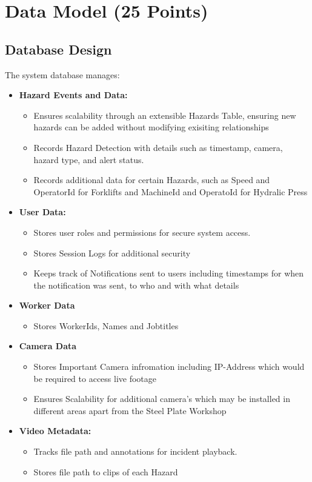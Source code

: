 \documentclass[12pt]{article}
\begin{document}
\newpage
\section{Data Model (25 Points)}
\subsection{Database Design}
The system database manages:
\begin{itemize}
    \item \textbf{Hazard Events and Data:} 
    \begin{itemize}
        \item Ensures scalability through an extensible Hazards Table, ensuring new hazards can be added without modifying exisiting relationships
        \item Records Hazard Detection with details such as timestamp, camera, hazard type, and alert status.
        \item Records additional data for certain Hazards, such as Speed and OperatorId for Forklifts and MachineId and OperatoId for Hydralic Press
    \end{itemize}
    \item \textbf{User Data:} 
    \begin{itemize}
    \item Stores user roles and permissions for secure system access.
    \item Stores Session Logs for additional security
    \item Keeps track of Notifications sent to users including timestamps for when the notification was sent, to who and with what details
    \end{itemize}
    \item \textbf{Worker Data}
    \begin{itemize}
    \item Stores WorkerIds, Names and Jobtitles
    \end{itemize}
    \item \textbf{Camera Data}
    \begin{itemize}
    \item Stores Important Camera infromation including IP-Address which would be required to access live footage
    \item Ensures Scalability for additional camera's which may be installed in different areas apart from the Steel Plate Workshop
    \end{itemize}
    \item \textbf{Video Metadata:}
    \begin{itemize} 
    \item Tracks file path and annotations for incident playback.
    \item Stores file path to clips of each Hazard
    \end{itemize}
\end{itemize}
\end{document}
